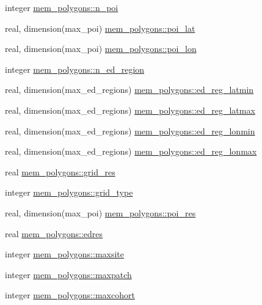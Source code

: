 \begin{DoxyCompactItemize}
\item 
integer \hyperlink{namespacemem__polygons_a40cfdce95dfd1bde88dfdc7e2aa9c667}{mem\+\_\+polygons\+::n\+\_\+poi}
\item 
real, dimension(max\+\_\+poi) \hyperlink{namespacemem__polygons_acf0a86c4cebdaacd2344c2af339605a3}{mem\+\_\+polygons\+::poi\+\_\+lat}
\item 
real, dimension(max\+\_\+poi) \hyperlink{namespacemem__polygons_aa70b00dd2ead0ce3911b4d7bed6e5212}{mem\+\_\+polygons\+::poi\+\_\+lon}
\item 
integer \hyperlink{namespacemem__polygons_aff9e65847e5c49e661181c4eaeee87f9}{mem\+\_\+polygons\+::n\+\_\+ed\+\_\+region}
\item 
real, dimension(max\+\_\+ed\+\_\+regions) \hyperlink{namespacemem__polygons_ab616081d94da98469edf2f12dd30dfa9}{mem\+\_\+polygons\+::ed\+\_\+reg\+\_\+latmin}
\item 
real, dimension(max\+\_\+ed\+\_\+regions) \hyperlink{namespacemem__polygons_afef0110728dd37e2b92f68741ed5d74a}{mem\+\_\+polygons\+::ed\+\_\+reg\+\_\+latmax}
\item 
real, dimension(max\+\_\+ed\+\_\+regions) \hyperlink{namespacemem__polygons_ad6aad9f40e9c8b83f5e606b80a765189}{mem\+\_\+polygons\+::ed\+\_\+reg\+\_\+lonmin}
\item 
real, dimension(max\+\_\+ed\+\_\+regions) \hyperlink{namespacemem__polygons_a333a8ea32bddc741bc03c089a0159e8d}{mem\+\_\+polygons\+::ed\+\_\+reg\+\_\+lonmax}
\item 
real \hyperlink{namespacemem__polygons_a8e7ef3eae774f6608d51a357e9fb36c0}{mem\+\_\+polygons\+::grid\+\_\+res}
\item 
integer \hyperlink{namespacemem__polygons_a277c4afc75feb5def72f823129129b2b}{mem\+\_\+polygons\+::grid\+\_\+type}
\item 
real, dimension(max\+\_\+poi) \hyperlink{namespacemem__polygons_abc1cd4ebde7513a27a637c90ac77477a}{mem\+\_\+polygons\+::poi\+\_\+res}
\item 
real \hyperlink{namespacemem__polygons_a73d1841f5ed2548669ab194d7c34a6e9}{mem\+\_\+polygons\+::edres}
\item 
integer \hyperlink{namespacemem__polygons_a6ea7e4cae77c3cdabf5313950a022aa1}{mem\+\_\+polygons\+::maxsite}
\item 
integer \hyperlink{namespacemem__polygons_a5ae9a33638a3c06042a5de43390a9f76}{mem\+\_\+polygons\+::maxpatch}
\item 
integer \hyperlink{namespacemem__polygons_a687ac81b378f4f880e80ce0b186bc6c5}{mem\+\_\+polygons\+::maxcohort}
\end{DoxyCompactItemize}
